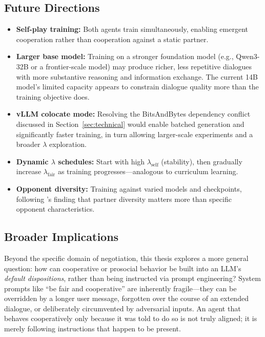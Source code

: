 \documentclass[12pt,a4paper]{article}
\begin{document}
\subsection{Future Directions}\label{sec:future_directions}

\begin{itemize}
    \item \textbf{Self-play training:} Both agents train simultaneously, enabling emergent cooperation rather than cooperation against a static partner.

    \item \textbf{Larger base model:} Training on a stronger foundation model (e.g., Qwen3-32B or a frontier-scale model) may produce richer, less repetitive dialogues with more substantive reasoning and information exchange. The current 14B model's limited capacity appears to constrain dialogue quality more than the training objective does.

    \item \textbf{vLLM colocate mode:} Resolving the BitsAndBytes dependency conflict discussed in Section~\ref{sec:technical} would enable batched generation and significantly faster training, in turn allowing larger-scale experiments and a broader $\lambda$ exploration.

    \item \textbf{Dynamic $\lambda$ schedules:} Start with high $\lambda_{\text{self}}$ (stability), then gradually increase $\lambda_{\text{fair}}$ as training progresses---analogous to curriculum learning.

    \item \textbf{Opponent diversity:} Training against varied models and checkpoints, following \citet{mckee2020social}'s finding that partner diversity matters more than specific opponent characteristics.
\end{itemize}

\subsection{Broader Implications}

Beyond the specific domain of negotiation, this thesis explores a more general question: how can cooperative or prosocial behavior be built into an LLM's \emph{default dispositions}, rather than being instructed via prompt engineering? System prompts like ``be fair and cooperative'' are inherently fragile---they can be overridden by a longer user message, forgotten over the course of an extended dialogue, or deliberately circumvented by adversarial inputs. An agent that behaves cooperatively only because it was told to do so is not truly aligned; it is merely following instructions that happen to be present.
\end{document}
